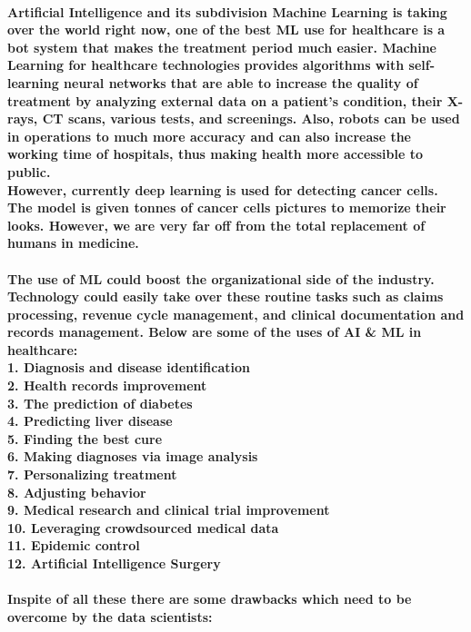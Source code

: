 \documentclass[12pt]{article}
\begin{document}
	\paragraph{Artificial Intelligence and its subdivision Machine Learning is taking over the world right now, one of the best ML use for healthcare is a bot system that makes the treatment period much easier. Machine Learning for healthcare technologies provides algorithms with self-learning neural networks that are able to increase the quality of treatment by analyzing external data on a patient’s condition, their X-rays, CT scans, various tests, and screenings. Also, robots can be used in operations to much  more accuracy and can also increase the working time of hospitals, thus making health more accessible to public.
	\\However, currently deep learning is used for detecting cancer cells. The model is given tonnes of cancer cells pictures to memorize their looks. However, we are very far off from the total replacement of humans in medicine.
    \\\\The use of ML could boost the organizational side of the industry. Technology could easily take over these routine tasks such as claims processing, revenue cycle management, and clinical documentation and records management. Below are some of the uses of AI \& ML in healthcare:
    \\\textbf{1. } Diagnosis and disease identification
    \\\textbf{2. } Health records improvement
    \\\textbf{3. } The prediction of diabetes
    \\\textbf{4. } Predicting liver disease
    \\\textbf{5. } Finding the best cure
    \\\textbf{6. } Making diagnoses via image analysis
    \\\textbf{7. } Personalizing treatment
    \\\textbf{8. } Adjusting behavior
    \\\textbf{9. } Medical research and clinical trial improvement
    \\\textbf{10.} Leveraging crowdsourced medical data
    \\\textbf{11.} Epidemic control
    \\\textbf{12.} Artificial Intelligence Surgery
    \\\\Inspite of all these there are some drawbacks which need to be overcome by the data scientists:
}
\end{document}

